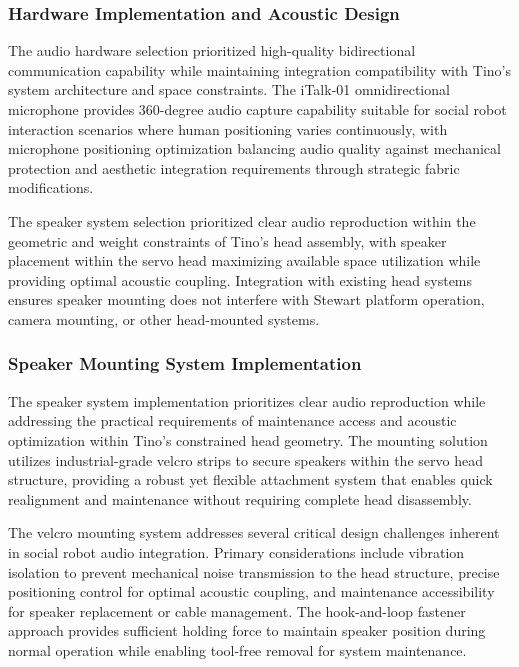 \subsubsection{Hardware Implementation and Acoustic Design}

The audio hardware selection prioritized high-quality bidirectional communication capability while maintaining integration compatibility with Tino's system architecture and space constraints. The iTalk-01 omnidirectional microphone provides 360-degree audio capture capability suitable for social robot interaction scenarios where human positioning varies continuously, with microphone positioning optimization balancing audio quality against mechanical protection and aesthetic integration requirements through strategic fabric modifications.

The speaker system selection prioritized clear audio reproduction within the geometric and weight constraints of Tino's head assembly, with speaker placement within the servo head maximizing available space utilization while providing optimal acoustic coupling. Integration with existing head systems ensures speaker mounting does not interfere with Stewart platform operation, camera mounting, or other head-mounted systems.

\subsubsection{Speaker Mounting System Implementation}

The speaker system implementation prioritizes clear audio reproduction while addressing the practical requirements of maintenance access and acoustic optimization within Tino's constrained head geometry. The mounting solution utilizes industrial-grade velcro strips to secure speakers within the servo head structure, providing a robust yet flexible attachment system that enables quick realignment and maintenance without requiring complete head disassembly.

The velcro mounting system addresses several critical design challenges inherent in social robot audio integration. Primary considerations include vibration isolation to prevent mechanical noise transmission to the head structure, precise positioning control for optimal acoustic coupling, and maintenance accessibility for speaker replacement or cable management. The hook-and-loop fastener approach provides sufficient holding force to maintain speaker position during normal operation while enabling tool-free removal for system maintenance.

